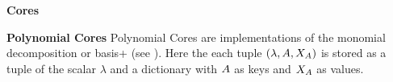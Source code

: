 
\textbf{Cores}



\textbf{Polynomial Cores}
Polynomial Cores are implementations of the monomial decomposition or basis+ (see ).
Here the each tuple $(\lambda,A,X_{A})$ is stored as a tuple of the scalar $\lambda$ and a dictionary with $A$ as keys and $X_{A}$ as values.




